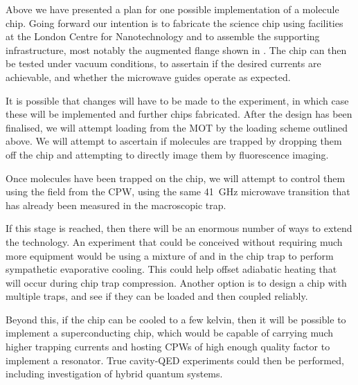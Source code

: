 Above we have presented a plan for one possible implementation of a molecule
chip. Going forward our intention is to fabricate the science chip using
facilities at the London Centre for Nanotechnology and to assemble the supporting
infrastructure, most notably the augmented flange shown in
. The chip can then be tested under vacuum
conditions, to assertain if the desired currents are achievable, and whether
the microwave guides operate as expected.

It is possible that changes will have to be made to the experiment, in which
case these will be implemented and further chips fabricated. After the design
has been finalised, we will attempt loading from the \CaF{} MOT by the loading
scheme outlined above. We will attempt to ascertain if molecules are trapped by
dropping them off the chip and attempting to directly image them by fluorescence
imaging.

Once molecules have been trapped on the chip, we will attempt to control them
using the field from the CPW, using the same \SI{41}{\giga\hertz} microwave
transition that has already been measured in the macroscopic trap.

If this stage is reached, then there will be an enormous number of ways to
extend the technology. An experiment that could be conceived without requiring
much more equipment would be using a mixture of \esRb{} and \CaF{} in the chip
trap to perform sympathetic evaporative cooling. This could help offset
adiabatic heating that will occur during chip trap compression. Another option
is to design a chip with multiple traps, and see if they can be loaded and then
coupled reliably.

Beyond this, if the chip can be cooled to a few kelvin, then it will be possible
to implement a superconducting chip, which would be capable of carrying much
higher trapping currents and hosting CPWs of high enough quality factor to
implement a resonator. True cavity-QED experiments could then be performed,
including investigation of hybrid quantum systems.
